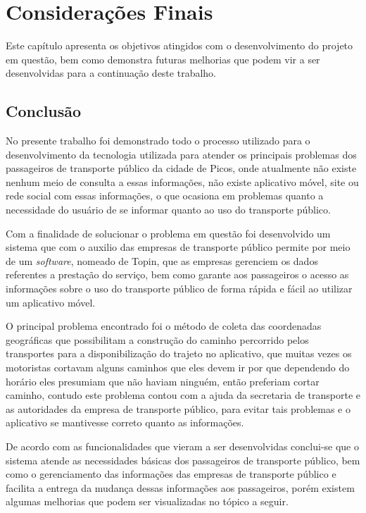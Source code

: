 \chapter{Considerações Finais}

Este capítulo apresenta os objetivos atingidos com o desenvolvimento do projeto em questão, bem como demonstra futuras melhorias que podem vir a ser desenvolvidas para a continuação deste trabalho.

\section{Conclusão}

No presente trabalho foi demonstrado todo o processo utilizado para o desenvolvimento da tecnologia utilizada para atender os principais problemas dos passageiros de transporte público da cidade de Picos, onde atualmente não existe nenhum meio de consulta a essas informações, não existe aplicativo móvel, site ou rede social com essas informações, o que ocasiona em problemas quanto a necessidade do usuário de se informar quanto ao uso do transporte público.

Com a finalidade de solucionar o problema em questão foi desenvolvido um sistema que com o auxilio das empresas de transporte público permite por meio de um \textit{software}, nomeado de Topin, que as empresas gerenciem os dados referentes a prestação do serviço, bem como garante aos passageiros o acesso as informações sobre o uso do transporte público de forma rápida e fácil ao utilizar um aplicativo móvel.

O principal problema encontrado foi o método de coleta das coordenadas geográficas que possibilitam a construção do caminho percorrido pelos transportes para a disponibilização do trajeto no aplicativo, que muitas vezes os motoristas cortavam alguns caminhos que eles devem ir por que dependendo do horário eles presumiam que não haviam ninguém, então preferiam cortar caminho, contudo este problema contou com a ajuda da secretaria de transporte e as autoridades da empresa de transporte público, para evitar tais problemas e o aplicativo se mantivesse correto quanto as informações.

De acordo com as funcionalidades que vieram a ser desenvolvidas conclui-se que o sistema atende as necessidades básicas dos passageiros de transporte público, bem como o gerenciamento das informações das empresas de transporte público e facilita a entrega da mudança dessas informações aos passageiros, porém existem algumas melhorias que podem ser visualizadas no tópico a seguir.


